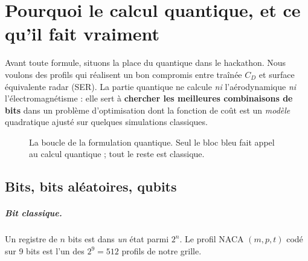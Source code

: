 \chapter{Pourquoi le calcul quantique, et ce qu'il fait vraiment}\label{ch:intro}

Avant toute formule, situons la place du quantique dans le hackathon. Nous voulons des profils qui réalisent un bon compromis entre traînée $C_D$ et surface équivalente radar (SER). La partie quantique ne calcule \emph{ni} l'aérodynamique \emph{ni} l'électromagnétisme : elle sert à \textbf{chercher les meilleures combinaisons de bits} dans un problème d'optimisation dont la fonction de coût est un \emph{modèle} quadratique ajusté sur quelques simulations classiques.

\begin{figure}[htbp]
\centering
{}
\caption{La boucle de la formulation quantique. Seul le bloc bleu fait appel au calcul quantique ; tout le reste est classique.}\label{fig:boucle-intro}
\end{figure}

\section{Bits, bits aléatoires, qubits}
\paragraph{Bit classique.} Un registre de $n$ bits est dans \emph{un} état parmi $2^n$. Le profil NACA $(m,p,t)$ codé sur 9 bits est l'un des $2^9=512$ profils de notre grille.

